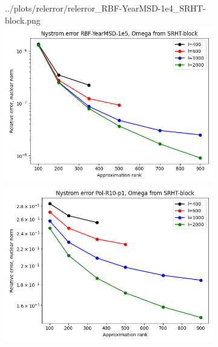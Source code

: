 \documentclass{article}
\theoremstyle{definition}
\begin{document}
\begin{figure}
\begin{subfigure}[t]{\textwidth+20pt\relax}
        {../plots/relerror/relerror_RBF-YearMSD-1e4_SRHT-block.png}
    \includegraphics[width=\dimexpr\linewidth-20pt\relax]
        {../plots/relerror/relerror_RBF-YearMSD-1e5_SRHT-block.png}
    \includegraphics[width=\dimexpr\linewidth-20pt\relax]
        {../plots/relerror/relerror_Pol-R10-p1_SRHT-block.png}

\end{subfigure}
\end{figure}
\end{document}
